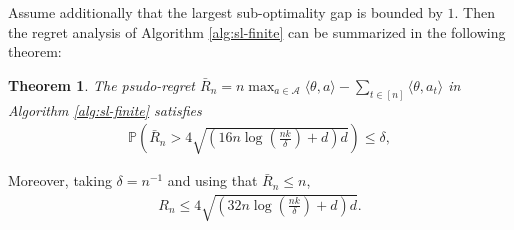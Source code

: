 \documentclass[letterpaper,11pt,openright,openany]{book}
\numberwithin{equation}{section}
\theoremstyle{plain}
\newtheorem{Th}{Theorem}[section]
\theoremstyle{definition}
\def\P{{\mathbb P}}
\def\t{{\theta}}
\begin{document}
Assume additionally that the largest sub-optimality gap is bounded by $1$. Then the regret analysis of Algorithm \ref{alg:sl-finite} can be summarized in the following theorem:

\begin{Th}\label{sl:finite}
The psudo-regret $\bar{R}_n=n\max_{a\in\mathcal A}\langle\t, a\rangle-\sum_{t\in [n]}\langle\t, a_t\rangle$ in Algorithm \ref{alg:sl-finite} satisfies
\begin{align*}
\P\left(\bar{R}_n>4\sqrt{\left(16n\log\left(\frac{nk}{\delta}\right)+d\right)d} \right)\leq \delta, 
\end{align*}
\end{Th}
Moreover, taking $\delta=n^{-1}$ and using that $\bar{R}_n\leq n$, 
\begin{align*}
R_n\leq 4\sqrt{\left(32n\log\left(\frac{nk}{\delta}\right)+d\right)d}.  
\end{align*}
\end{document}
